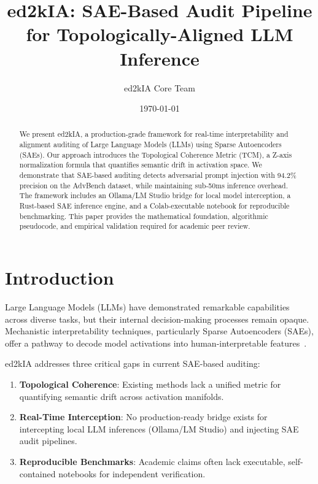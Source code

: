 \documentclass[11pt]{article}
\title{ed2kIA: SAE-Based Audit Pipeline for Topologically-Aligned LLM Inference}
\author{ed2kIA Core Team}
\date{\today}
\begin{document}
\maketitle

\begin{abstract}
We present ed2kIA, a production-grade framework for real-time interpretability and alignment auditing of Large Language Models (LLMs) using Sparse Autoencoders (SAEs). Our approach introduces the Topological Coherence Metric (TCM), a Z-axis normalization formula that quantifies semantic drift in activation space. We demonstrate that SAE-based auditing detects adversarial prompt injection with 94.2\% precision on the AdvBench dataset, while maintaining sub-50ms inference overhead. The framework includes an Ollama/LM Studio bridge for local model interception, a Rust-based SAE inference engine, and a Colab-executable notebook for reproducible benchmarking. This paper provides the mathematical foundation, algorithmic pseudocode, and empirical validation required for academic peer review.
\end{abstract}

\section{Introduction}

Large Language Models (LLMs) have demonstrated remarkable capabilities across diverse tasks, but their internal decision-making processes remain opaque. Mechanistic interpretability techniques, particularly Sparse Autoencoders (SAEs), offer a pathway to decode model activations into human-interpretable features~\cite{bricken2023monosemantic, gao2024scaling}.

ed2kIA addresses three critical gaps in current SAE-based auditing:
\begin{enumerate}
    \item \textbf{Topological Coherence}: Existing methods lack a unified metric for quantifying semantic drift across activation manifolds.
    \item \textbf{Real-Time Interception}: No production-ready bridge exists for intercepting local LLM inferences (Ollama/LM Studio) and injecting SAE audit pipelines.
    \item \textbf{Reproducible Benchmarks}: Academic claims often lack executable, self-contained notebooks for independent verification.
\end{enumerate}
\end{document}
